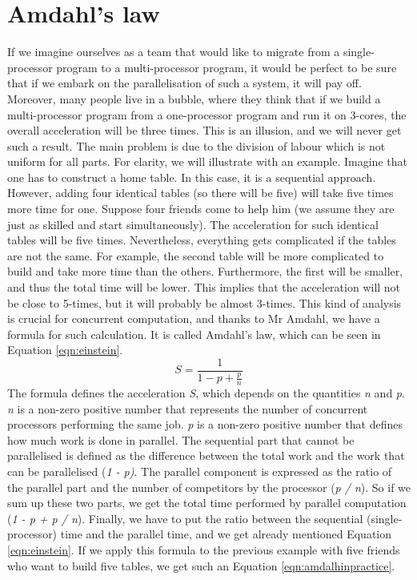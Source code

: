 \section{Amdahl's law}
\label{04:amdalhlaw}

If we imagine ourselves as a team that would like to migrate from a single-processor program to a multi-processor program, it would be perfect to be sure that if we embark on the parallelisation of such a system, it will pay off. Moreover, many people live in a bubble, where they think that if we build a multi-processor program from a one-processor program and run it on 3-cores, the overall acceleration will be three times. This is an illusion, and we will never get such a result. The main problem is due to the division of labour which is not uniform for all parts. For clarity, we will illustrate with an example. Imagine that one has to construct a home table. In this case, it is a sequential approach. However, adding four identical tables (so there will be five) will take five times more time for one. Suppose four friends come to help him (we assume they are just as skilled and start simultaneously). The acceleration for such identical tables will be five times. Nevertheless, everything gets complicated if the tables are not the same. For example, the second table will be more complicated to build and take more time than the others. Furthermore, the first will be smaller, and thus the total time will be lower. This implies that the acceleration will not be close to 5-times, but it will probably be almost 3-times. This kind of analysis is crucial for concurrent computation, and thanks to Mr Amdahl, we have a formula for such calculation. It is called Amdahl's law, which can be seen in Equation \eqref{eqn:einstein}.
\begin{equation}
    \label{eqn:einstein}
    S = \frac{1}{1 - p + \frac{p}{n}}
    \tag{1}
\end{equation}
The formula defines the acceleration \emph{S}, which depends on the quantities \emph{n} and \emph{p}. \emph{n} is a non-zero positive number that represents the number of concurrent processors performing the same job. \emph{p} is a non-zero positive number that defines how much work is done in parallel. The sequential part that cannot be parallelised is defined as the difference between the total work and the work that can be parallelised (\emph{1 - p)}. The parallel component is expressed as the ratio of the parallel part and the number of competitors by the processor (\emph{p / n}). So if we sum up these two parts, we get the total time performed by parallel computation (\emph{1 - p + p / n}). Finally, we have to put the ratio between the sequential (single-processor) time and the parallel time, and we get already mentioned Equation \ref{eqn:einstein}. If we apply this formula to the previous example with five friends who want to build five tables, we get such an Equation \eqref{eqn:amdalhinpractice}.

